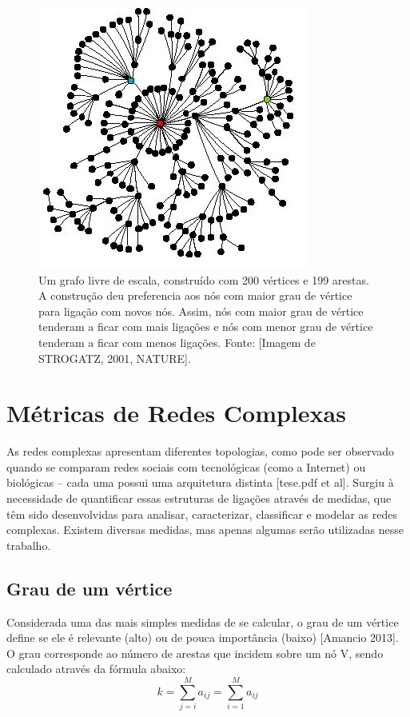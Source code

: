 \documentclass[xindy,rascunho]{fei}
\begin{document}
\begin{figure}
\centering
\includegraphics[width=0.7\linewidth]{./Imagens_Monografia/410268ac2(RedeLivreDeEscala).jpg}
\caption{Um grafo livre de escala, construído com 200 vértices e 199 arestas. A construção deu preferencia aos nós com maior grau de vértice para ligação com novos nós. Assim, nós com maior grau de vértice tenderam a ficar com mais ligações e nós com menor grau de vértice tenderam a ficar com menos ligações. Fonte: [Imagem de STROGATZ, 2001, NATURE].}
\label{fig:RedeLivreDeEscala}
\end{figure}

\section{Métricas de Redes Complexas}

As redes complexas apresentam diferentes topologias, como pode ser observado quando se comparam redes sociais com tecnológicas (como a Internet) ou biológicas – cada uma possui uma arquitetura distinta [tese.pdf et al].  Surgiu à necessidade de quantificar essas estruturas de ligações através de medidas, que têm sido desenvolvidas para analisar, caracterizar, classificar e modelar as redes complexas. Existem diversas medidas, mas apenas algumas serão utilizadas nesse trabalho.

\subsection{Grau de um vértice}
Considerada uma das mais simples medidas de se calcular, o grau de um vértice define se ele é relevante (alto) ou de pouca importância (baixo) [Amancio 2013]. O grau corresponde ao número de arestas que incidem sobre um nó V, sendo calculado através da fórmula abaixo:
\begin{equation} \label{eq:GrauVertice}
k = \sum_{j = i}^{M}a_{ij} = \sum_{i=1}^{M}a_{ij}
\end{equation}
\end{document}
